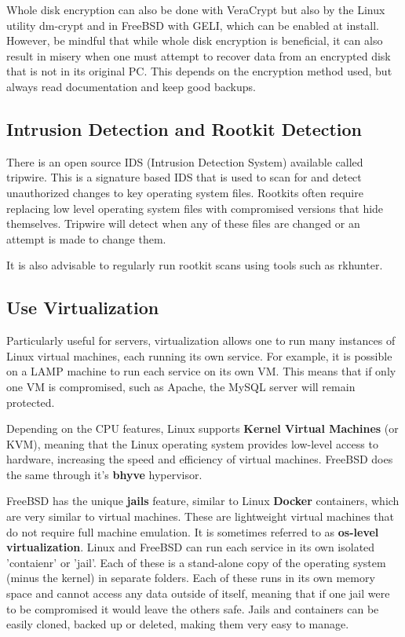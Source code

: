 Whole disk encryption can also be done with VeraCrypt but also by the Linux utility dm-crypt and in FreeBSD with GELI, which can be enabled at install. However, be mindful that while whole disk encryption is beneficial, it can also result in misery when one must attempt to recover data from an encrypted disk that is not in its original PC. This depends on the encryption method used, but always read documentation and keep good backups.

\subsection{Intrusion Detection and Rootkit Detection}

There is an open source IDS (Intrusion Detection System) available called tripwire. This is a signature based IDS that is used to scan for and detect unauthorized changes to key operating system files. Rootkits often require replacing low level operating system files with compromised versions that hide themselves. Tripwire will detect when any of these files are changed or an attempt is made to change them.

It is also advisable to regularly run rootkit scans using tools such as rkhunter.

\subsection{Use Virtualization}

Particularly useful for servers, virtualization allows one to run many instances of Linux virtual machines, each running its own service. For example, it is possible on a LAMP machine to run each service on its own VM. This means that if only one VM is compromised, such as Apache, the MySQL server will remain protected.

Depending on the CPU features, Linux supports \textbf{Kernel Virtual Machines} (or KVM), meaning that the Linux operating system provides low-level access to hardware, increasing the speed and efficiency of virtual machines. FreeBSD does the same through it's \textbf{bhyve} hypervisor. 

FreeBSD has the unique \textbf{jails} feature, similar to Linux \textbf{Docker} containers, which are very similar to virtual machines. These are lightweight virtual machines that do not require full machine emulation.  It is sometimes referred to as \textbf{os-level virtualization}.  Linux and FreeBSD can run each service in its own isolated 'contaienr' or ’jail’. Each of these is a stand-alone copy of the operating system (minus the kernel) in separate folders. Each of these runs in its own memory space and cannot access any data outside of itself, meaning that if one jail were to be compromised it would leave the others safe.  Jails and containers can be easily cloned, backed up or deleted, making them very easy to manage.

